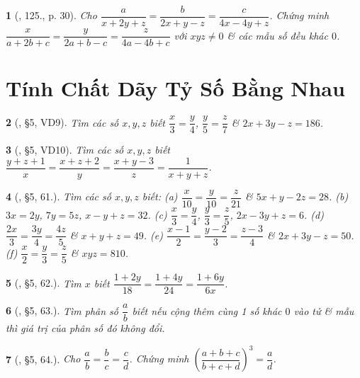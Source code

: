 \documentclass{article}
\newtheorem{baitoan}{}
\begin{document}
\begin{baitoan}[\cite{Tuyen_Toan_7}, 125., p. 30]
	Cho $\dfrac{a}{x + 2y + z} = \dfrac{b}{2x + y - z} = \dfrac{c}{4x - 4y + z}$. Chứng minh $\dfrac{x}{a + 2b + c} = \dfrac{y}{2a + b - c} = \dfrac{z}{4a - 4b + c}$ với $xyz\ne 0$ \& các mẫu số đều khác $0$.
\end{baitoan}


\section{Tính Chất Dãy Tỷ Số Bằng Nhau}

\begin{baitoan}[\cite{Binh_Toan_7_tap_1}, \S5, VD9]
	Tìm các số $x,y,z$ biết $\dfrac{x}{3} = \dfrac{y}{4}$, $\dfrac{y}{5} = \dfrac{z}{7}$ \& $2x + 3y - z = 186$.
\end{baitoan}

\begin{baitoan}[\cite{Binh_Toan_7_tap_1}, \S5, VD10]
	Tìm các số $x,y,z$ biết $\dfrac{y + z + 1}{x} = \dfrac{x + z + 2}{y} = \dfrac{x + y - 3}{z} = \dfrac{1}{x + y + z}$.
\end{baitoan}

\begin{baitoan}[\cite{Binh_Toan_7_tap_1}, \S5, 61.]
	Tìm các số $x,y,z$ biết: (a) $\dfrac{x}{10} = \dfrac{y}{10} = \dfrac{z}{21}$ \& $5x + y - 2z = 28$. (b) $3x = 2y$, $7y = 5z$, $x - y + z = 32$. (c) $\dfrac{x}{3} = \dfrac{y}{4}$, $\dfrac{y}{3} = \dfrac{z}{5}$, $2x - 3y + z = 6$. (d) $\dfrac{2x}{3} = \dfrac{3y}{4} = \dfrac{4z}{5}$ \& $x + y + z = 49$. (e) $\dfrac{x - 1}{2} = \dfrac{y - 2}{3} = \dfrac{z - 3}{4}$ \& $2x + 3y - z = 50$. (f) $\dfrac{x}{2} = \dfrac{y}{3} = \dfrac{z}{5}$ \& $xyz = 810$.	
\end{baitoan}

\begin{baitoan}[\cite{Binh_Toan_7_tap_1}, \S5, 62.]
	Tìm $x$ biết $\dfrac{1 + 2y}{18} = \dfrac{1 + 4y}{24} = \dfrac{1 + 6y}{6x}$.
\end{baitoan}

\begin{baitoan}[\cite{Binh_Toan_7_tap_1}, \S5, 63.]
	Tìm phân số $\dfrac{a}{b}$ biết nếu cộng thêm cùng 1 số khác $0$ vào tử \& mẫu thì giá trị của phân số đó không đổi.
\end{baitoan}

\begin{baitoan}[\cite{Binh_Toan_7_tap_1}, \S5, 64.]
	Cho $\dfrac{a}{b} = \dfrac{b}{c} = \dfrac{c}{d}$. Chứng minh $\left(\dfrac{a + b + c}{b + c + d}\right)^3 = \dfrac{a}{d}$.
\end{baitoan}
\end{document}
